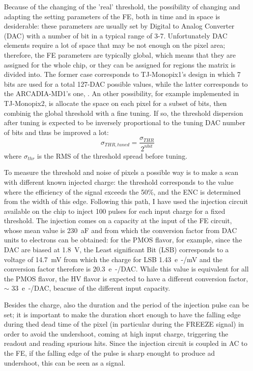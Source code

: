         Because of the changing of the 'real' threshold, the possibility of changing and adapting the setting parameters of the FE, both in time and in space is desiderable: these parameters are usually set by Digital to Analog Converter (DAC) with a number of bit in a typical range of 3-7.
        Unfortunately DAC elements require a lot of space that may be not enough on the pixel area; therefore, the FE parameters are typically global, which means that they are assigned for the whole chip, or they can be assigned for regions the matrix is divided into. 
        The former case corresponds to TJ-Monopix1's design in which 7 bits are used for a total 127-DAC possible values, while the latter corresponds to the ARCADIA-MD1's one, . 
        An other possibility, for example implemented in TJ-Monopix2, is allocate the space on each pixel for a subset of bits, then combinig the global threshold with a fine tuning. 
        If so, the threshold dispersion after tuning is expected to be inversely proportional to the tuning DAC number of bits and thus be improved a lot:
        \begin{equation}
            \sigma_{THR, tuned} = \frac{\sigma_{THR}}{2^{n bit}}
        \end{equation}    
        where $\sigma_{thr}$ is the RMS of the threshold spread before tuning.

        To measure the threshold and noise of pixels a possible way is to make a scan with different known injected charge: the threshold corresponds to the value where the efficiency of the signal exceeds the 50\%, and the ENC is determined from the width of this edge.        
        Following this path, I have used the injection circuit available on the chip to inject 100 pulses for each input charge for a fixed threshold.
        The injection comes on a capacity at the input of the FE circuit, whose mean value is \SI{230}{aF} and from which the conversion factor from DAC units to electrons can be obtained: for the PMOS flavor, for example, since the DAC are biased at \SI{1.8}{V}, the Least significant Bit (LSB) corresponds to a voltage of \SI{14.7}{mV} from which the charge for LSB \SI{1.43}{e-/mV} and the conversion factor therefore is \SI{20.3}{e-/DAC}.     
        While this value is equivalent for all the PMOS flavor, the HV flavor is expected to have a different conversion factor, $\sim$ \SI{33}{e-/DAC}, beacuse of the different input capacity. 

        Besides the charge, also the duration and the period of the injection pulse can be set; it is important to make the duration short enough to have the falling edge during thed dead time of the pixel (in particular during the FREEZE signal) in order to avoid the undershoot, coming at high input charge, triggering the readout and reading spurious hits. 
        Since the injection circuit is coupled in AC to the FE, if the falling edge of the pulse is sharp enought to produce ad undershoot, this can be seen as a signal. 

